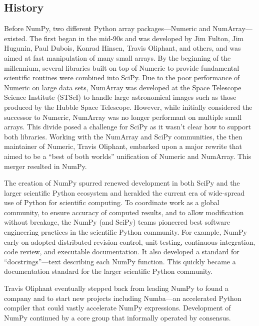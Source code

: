 \subsection{History}

Before NumPy, two different Python array packages—Numeric and NumArray—existed.
The first began in the mid-90s and was developed by Jim Fulton, Jim Hugunin,
Paul Dubois, Konrad Hinsen, Travis Oliphant, and others, and was aimed at fast
manipulation of many small arrays.
By the beginning of the millennium, several libraries built on top of Numeric 
to provide fundamental scientific routines were combined into SciPy.
Due to the poor performance of Numeric on large data sets, NumArray was
developed at the Space Telescope Science Institute (STScI) to handle
large astronomical images such as those produced by the Hubble Space Telescope.
However, while initially considered the successor to Numeric, NumArray was no longer
performant on multiple small arrays.
This divide posed a challenge for SciPy as it wasn't clear how to support
both libraries.
Working with the NumArray and SciPy communities, the then maintainer of Numeric,
Travis Oliphant, embarked upon a major rewrite that aimed to be a ``best of both
worlds'' unification of Numeric and NumArray. This merger resulted in NumPy.

The creation of NumPy spurred renewed development in both SciPy and the larger
scientific Python ecosystem and heralded the current era of wide-spread use of
Python for scientific computing.
To coordinate work as a global community, to ensure accuracy of computed
results, and to allow modification without breakage, the NumPy (and SciPy) teams
pioneered best software engineering practices in the scientific Python
community\cite{millman2014developing}.
For example, NumPy early on adopted distributed revision control, unit testing,
continuous integration, code review, and executable documentation.
It also developed a standard for ``docstrings''—text describing each NumPy function.
This quickly became a documentation standard for the larger scientific Python community. 

Travis Oliphant eventually stepped back from leading NumPy to found a
company and to start new projects including Numba---an accelerated Python
compiler that could vastly accelerate NumPy expressions.  Development
of NumPy continued by a core group that informally operated by
consensus.


